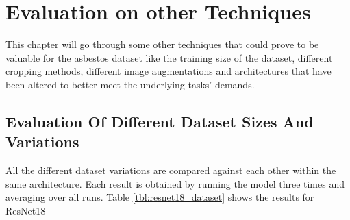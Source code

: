 \chapter{Evaluation on other Techniques}

This chapter will go through some other techniques that could prove to be valuable for the asbestos dataset like the training size of the dataset, different cropping methods, different image augmentations and architectures that have been altered to better meet the underlying tasks' demands.

\section{Evaluation Of Different Dataset Sizes And Variations}

All the different dataset variations are compared against each other within the same architecture. Each result is obtained by running the model three times and averaging over all runs. Table \ref{tbl:resnet18_dataset} shows the results for ResNet18

\begin{table}[h] \centering
{}
\caption{Dataset variations with ResNet18. The first group shows how the datasets performed when trained from scratch whereas the second group shows how the datasets performed with pre-training.}
\label{tbl:resnet18_dataset_a}
\end{table}

